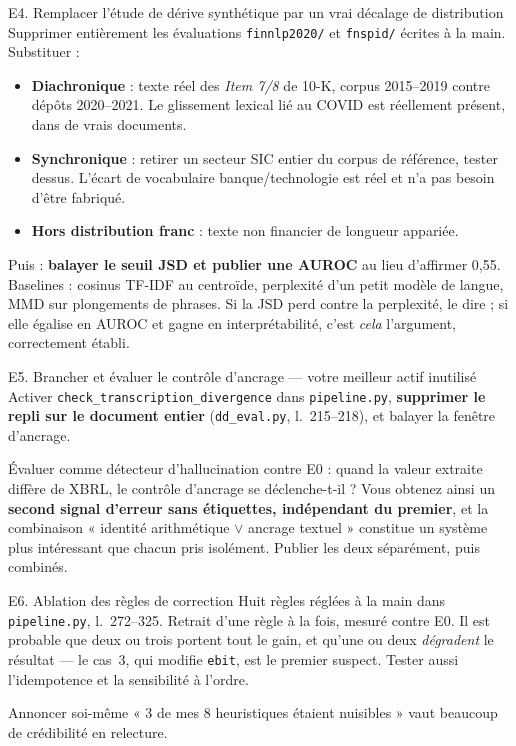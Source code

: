 \documentclass[11pt,a4paper]{article}
\newcommand{\fic}[1]{\texttt{\small #1}}
\begin{document}
\begin{exper}{E4. Remplacer l'étude de dérive synthétique par un vrai décalage de distribution}
Supprimer entièrement les évaluations \fic{finnlp2020/} et \fic{fnspid/}
écrites à la main. Substituer :

\begin{itemize}[leftmargin=*, itemsep=2pt]
\item \textbf{Diachronique} : texte réel des \textit{Item 7/8} de 10-K, corpus
2015--2019 contre dépôts 2020--2021. Le glissement lexical lié au COVID est
réellement présent, dans de vrais documents.
\item \textbf{Synchronique} : retirer un secteur SIC entier du corpus de
référence, tester dessus. L'écart de vocabulaire banque/technologie est réel et
n'a pas besoin d'être fabriqué.
\item \textbf{Hors distribution franc} : texte non financier de longueur
appariée.
\end{itemize}

Puis : \textbf{balayer le seuil JSD et publier une AUROC} au lieu d'affirmer
0,55. Baselines : cosinus TF-IDF au centroïde, perplexité d'un petit modèle de
langue, MMD sur plongements de phrases. Si la JSD perd contre la perplexité, le
dire ; si elle égalise en AUROC et gagne en interprétabilité, c'est
\emph{cela} l'argument, correctement établi.
\end{exper}

\begin{exper}{E5. Brancher et évaluer le contrôle d'ancrage --- votre meilleur actif inutilisé}
Activer \fic{check\_transcription\_divergence} dans \fic{pipeline.py},
\textbf{supprimer le repli sur le document entier} (\fic{dd\_eval.py},
l.~215--218), et balayer la fenêtre d'ancrage.

Évaluer comme détecteur d'hallucination contre E0 : quand la valeur extraite
diffère de XBRL, le contrôle d'ancrage se déclenche-t-il ? Vous obtenez ainsi un
\textbf{second signal d'erreur sans étiquettes, indépendant du premier}, et la
combinaison « identité arithmétique $\vee$ ancrage textuel » constitue un
système plus intéressant que chacun pris isolément. Publier les deux séparément,
puis combinés.
\end{exper}

\begin{exper}{E6. Ablation des règles de correction}
Huit règles réglées à la main dans \fic{pipeline.py}, l.~272--325.
Retrait d'une règle à la fois, mesuré contre E0. Il est probable que deux ou
trois portent tout le gain, et qu'une ou deux \emph{dégradent} le résultat --- le
cas~3, qui modifie \fic{ebit}, est le premier suspect. Tester aussi l'idempotence
et la sensibilité à l'ordre.

Annoncer soi-même « 3 de mes 8 heuristiques étaient nuisibles » vaut beaucoup de
crédibilité en relecture.
\end{exper}
\end{document}
